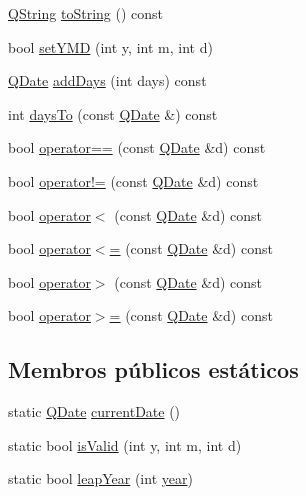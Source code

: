 \begin{DoxyCompactItemize}
\item 
\hyperlink{class_q_string}{Q\-String} \hyperlink{class_q_date_a8aabbf2e3c7be33fa5769a5eab3eef6f}{to\-String} () const 
\item 
bool \hyperlink{class_q_date_ad97bdddadf0a00132cf3a1dbd295d5cc}{set\-Y\-M\-D} (int y, int m, int d)
\item 
\hyperlink{class_q_date}{Q\-Date} \hyperlink{class_q_date_a011673a760ff6b5d46f96b419d133b6a}{add\-Days} (int days) const 
\item 
int \hyperlink{class_q_date_ab3ae85ecd83cd1b8ee53616f9918f579}{days\-To} (const \hyperlink{class_q_date}{Q\-Date} \&) const 
\item 
bool \hyperlink{class_q_date_a9b609ea26e867112778a75625b157c4b}{operator==} (const \hyperlink{class_q_date}{Q\-Date} \&d) const 
\item 
bool \hyperlink{class_q_date_a1ab21a98f25848d4b0d3f3fa9303e1ee}{operator!=} (const \hyperlink{class_q_date}{Q\-Date} \&d) const 
\item 
bool \hyperlink{class_q_date_a8dff457236f689028017539f29a03539}{operator$<$} (const \hyperlink{class_q_date}{Q\-Date} \&d) const 
\item 
bool \hyperlink{class_q_date_afb3bb30652c326b64c141a489c97b6fd}{operator$<$=} (const \hyperlink{class_q_date}{Q\-Date} \&d) const 
\item 
bool \hyperlink{class_q_date_a18f0fbd209e001f92d671399db32e567}{operator$>$} (const \hyperlink{class_q_date}{Q\-Date} \&d) const 
\item 
bool \hyperlink{class_q_date_a8add8d59a68558673d96576f9e2859d8}{operator$>$=} (const \hyperlink{class_q_date}{Q\-Date} \&d) const 
\end{DoxyCompactItemize}
\subsection*{Membros públicos estáticos}
\begin{DoxyCompactItemize}
\item 
static \hyperlink{class_q_date}{Q\-Date} \hyperlink{class_q_date_a61ad3df11782433257f49a009a29ac71}{current\-Date} ()
\item 
static bool \hyperlink{class_q_date_af24f0073aca871403f030f9367504733}{is\-Valid} (int y, int m, int d)
\item 
static bool \hyperlink{class_q_date_a1c5b3bbbf2af82a50e5b7c9f47eeeb2d}{leap\-Year} (int \hyperlink{class_q_date_ab30e3b28d52eaa040cf319dd6dc1e540}{year})
\end{DoxyCompactItemize}
